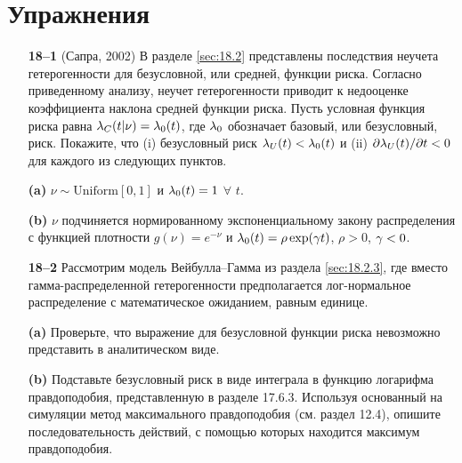 \section{Упражнения}\label{sec:18.ex}

\noindent

\begin{itemize}
    \item[\textbf{18--1}]
(Сапра, 2002)
В разделе \ref{sec:18.2} представлены последствия неучета гетерогенности для безусловной, или средней, функции риска. Согласно приведенному анализу, неучет гетерогенности приводит к недооценке коэффициента наклона средней функции риска. Пусть условная функция риска равна $\lambda_C(t|\nu) = \lambda_0(t)$, где $\lambda_0$ обозначает базовый, или безусловный, риск. Покажите, что (i) безусловный риск $\lambda_U(t) < \lambda_0(t)$ и (ii) $\partial\lambda_U(t)/\partial t < 0$ для каждого из следующих пунктов.
        \item[\textbf{(a)}]
$\nu \sim \mathrm{Uniform}[0,1]$ и $\lambda_0(t) = 1$ $\forall$ $t$.
        \item[\textbf{(b)}]
$\nu$ подчиняется нормированному экспоненциальному закону распределения с функцией плотности $g(\nu) = e^{-\nu}$ и $\lambda_0(t) = \rho \exp(\gamma t)$, $\rho > 0$, $\gamma < 0$.

    \item[\textbf{18--2}]
Рассмотрим модель Вейбулла--Гамма из раздела \ref{sec:18.2.3}, где вместо гамма-распределенной гетерогенности предполагается лог-нормальное распределение с математическое ожиданием, равным единице.
        \item[\textbf{(a)}]
Проверьте, что выражение для безусловной функции риска невозможно представить в аналитическом виде.
        \item[\textbf{(b)}]
Подставьте безусловный риск в виде интеграла в функцию логарифма правдоподобия, представленную в разделе 17.6.3. %
Используя основанный на симуляции метод максимального правдоподобия (см. раздел 12.4), %
опишите последовательность действий, с помощью которых находится максимум правдоподобия.


\end{itemize}
